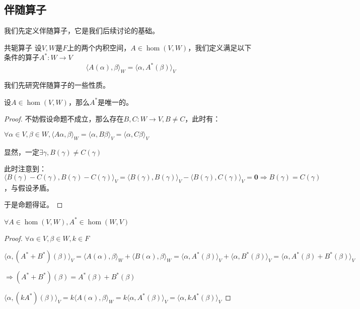 \documentclass[12pt, a4paper, oneside, UTF8]{ctexbook}
\begin{document}
		\subsection{伴随算子}
			我们先定义伴随算子，它是我们后续讨论的基础。
			\begin{defn}{共轭算子}{}
				设$V,W$是$F$上的两个内积空间，$A \in \hom(V,W)$，我们定义满足以下条件的算子$A^* : W \to V$
				\begin{equation}
					\langle A(\alpha) ,\beta \rangle_W =\langle \alpha ,A^*(\beta) \rangle_V
				\end{equation}
			\end{defn}
			我们先研究伴随算子的一些性质。
			\begin{para}{0}
				\point{}
					\begin{proposition}
						设$A \in \hom(V,W)$，那么$A^*$是唯一的。
					\end{proposition}
					\begin{proof}
						不妨假设命题不成立，那么存在$B,C : W \to V,B \neq C$，此时有：

						$\forall \alpha\in V,\beta \in W,\langle A\alpha ,\beta \rangle_W =\langle \alpha ,B\beta \rangle_V =\langle \alpha ,C\beta \rangle_V$

						显然，一定$\exists \gamma ,B(\gamma )\neq C(\gamma )$

						此时注意到：$\langle B(\gamma )-C(\gamma ),B(\gamma )-C(\gamma )\rangle_V = \langle B(\gamma ),B(\gamma )\rangle_V - \langle B(\gamma ),C(\gamma )\rangle_V =\mathbf{0} \Rightarrow B(\gamma )=C(\gamma )$，与假设矛盾。

						于是命题得证。
					\end{proof}
				\point{}
					\begin{proposition}
						$\forall A \in \hom(V,W),A^* \in \hom(W,V)$
					\end{proposition}
					\begin{proof}
						$\forall \alpha\in V,\beta \in W,k \in F$

						$\langle \alpha ,(A^*+B^*)(\beta ) \rangle_V =\langle A(\alpha ),\beta \rangle_W +\langle B(\alpha ),\beta \rangle_W =\langle \alpha ,A^*(\beta ) \rangle_V +\langle \alpha ,B^*(\beta ) \rangle_V =\langle \alpha ,A^*(\beta )+B^*(\beta ) \rangle_V$

						$\Rightarrow (A^*+B^*)(\beta )=A^*(\beta )+B^*(\beta )$

						$\langle \alpha ,(kA^*)(\beta ) \rangle_V =k\langle A(\alpha ),\beta \rangle_W =k\langle \alpha ,A^*(\beta ) \rangle_V =\langle \alpha ,kA^*(\beta ) \rangle_V$


\end{proof}
\end{para}
\end{document}
